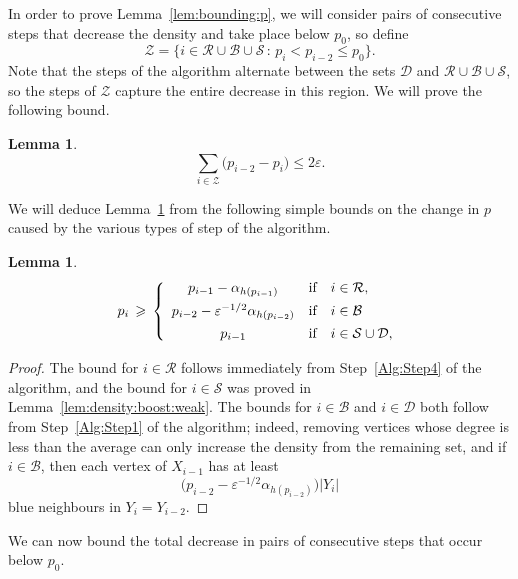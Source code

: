 \documentclass[12pt,reqno]{amsart}
\newtheorem{lemma}[theorem]{Lemma}
\theoremstyle{definition}
\theoremstyle{remark}
\newcommand\cB{\mathcal{B}}
\newcommand\cZ{\mathcal{Z}}
\def\cS{\mathcal{S}}
\newcommand\eps{\varepsilon}
\renewcommand{\le}{\leqslant}
\renewcommand{\ge}{\geqslant}
\def\eps{\varepsilon}
\def\cD{\mathcal{D}}
\def\cR{\mathcal{R}}
\def\cB{\mathcal{B}}
\begin{document}
In order to prove Lemma~\ref{lem:bounding:p}, we will consider pairs of consecutive steps that decrease the density and take place below $p_0$, so define
\begin{equation}\label{def:Z}
\cZ = \big\{ i \in \cR \cup \cB \cup \cS \,:\, p_i < p_{i-2} \le p_0 \big\}.
\end{equation}
Note that the steps of the algorithm alternate between the sets $\cD$ and $\cR \cup \cB \cup \cS$, so the steps of $\cZ$ capture the entire decrease in this region. We will prove the following bound. 

\begin{lemma}\label{lem:Z:decrease}
$$\sum_{i \in \cZ} \big( p_{i-2} - p_i \big) \le 2\eps.$$
\end{lemma}

We will deduce Lemma~\ref{lem:Z:decrease} from the following simple bounds on the change in $p$ caused by the various types of step of the algorithm. 

\begin{lemma}\label{lem:jumping:p}
\[
    p_i \,\ge\, \left\{
    \begin{array} {c@{\quad \textup{if} \quad}l}
      p_{i-1} - \alpha_{h(p_{i-1})} & i \in \cR, \\[+1ex]
      p_{i-2} - \eps^{-1/2} \alpha_{h(p_{i-2})} & i \in \cB\\[+1ex]
      p_{i-1} & i \in \cS \cup \cD,
    \end{array}\right.
  \]
\end{lemma}

\begin{proof}
The bound for $i \in \cR$ follows immediately from Step~\ref{Alg:Step4} of the algorithm, and the bound for $i \in \cS$ was proved in Lemma~\ref{lem:density:boost:weak}. The bounds for $i \in \cB$ and $i \in \cD$ both follow from Step~\ref{Alg:Step1} of the algorithm; indeed, removing vertices whose degree is less than the average %
can only increase the density from the remaining set, and if $i \in \cB$, then each vertex of $X_{i-1}$ has at least 
$$\big( p_{i-2} - \eps^{-1/2} \alpha_{h(p_{i-2})} \big) |Y_i|$$
blue neighbours in $Y_i = Y_{i-2}$. 
\end{proof}

We can now bound the total decrease in pairs of consecutive steps that occur below $p_0$. 
\end{document}
